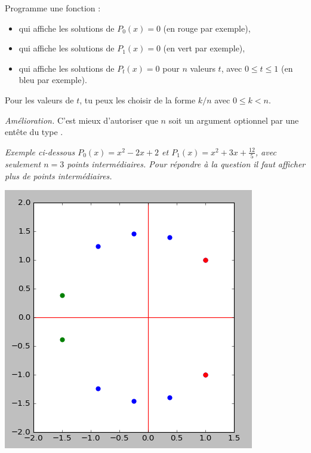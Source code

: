 \documentclass[11pt,class=report,crop=false]{standalone}
\begin{document}
\begin{activite}
\begin{enumerate}
  Programme une fonction  :
  \begin{itemize}
    \item qui affiche les solutions de $P_0(x)=0$ (en rouge par exemple),
    \item qui affiche les solutions de $P_1(x)=0$ (en vert par exemple),    
    \item qui affiche les solutions de $P_t(x)=0$ pour $n$ valeurs $t$, avec $0 \le t \le1$ (en bleu par exemple).
  \end{itemize}
  
  Pour les valeurs de $t$, tu peux les choisir de la forme $k/n$ avec $0 \le k < n$.
  
  \emph{Amélioration.} C'est mieux d'autoriser que $n$ soit un argument optionnel par une entête du type  .
  
  
  
\emph{Exemple ci-dessous $P_0(x) = x^2-2x+2$ et $P_1(x) = x^2+3x+\frac{12}{5}$, avec seulement $n=3$ points intermédiaires. Pour répondre à la question il faut afficher plus de points intermédiaires.}
\begin{center}
\includegraphics[scale=\myscale,scale=0.5]{ecran-complexes1-5b}
\end{center}	 

\end{enumerate} 
\end{activite}
\end{document}
